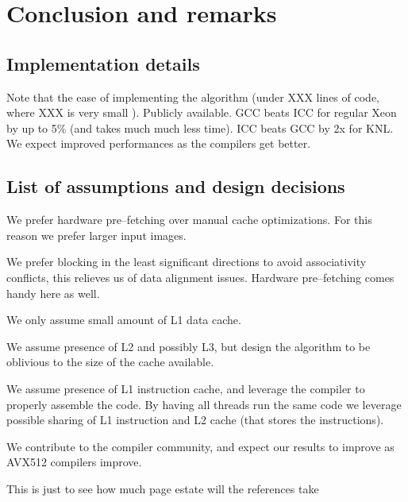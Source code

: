 \section{Conclusion and remarks}


\subsection{Implementation details}

  Note that the ease of implementing the algorithm (under XXX lines of
  code, where XXX is very small ).
  Publicly available.  GCC beats ICC for regular Xeon by up to 5\%
  (and takes much much less time).  ICC beats GCC by 2x for KNL.  We
  expect improved performances as the compilers get better.



\subsection{List of assumptions and design decisions}

  We prefer hardware pre--fetching over manual cache optimizations.
  For this reason we prefer larger input images.

  We prefer blocking in the least significant directions to avoid
  associativity conflicts, this relieves us of data alignment issues.
  Hardware pre--fetching comes handy here as well.

  We only assume small amount of L1 data cache.

  We assume presence of L2 and possibly L3, but design the algorithm
  to be oblivious to the size of the cache available.

  We assume presence of L1 instruction cache, and leverage the
  compiler to properly assemble the code.  By having all threads run
  the same code we leverage possible sharing of L1 instruction and L2
  cache (that stores the instructions).

  We contribute to the compiler community, and expect our results to
  improve as AVX512 compilers improve.

  This is just to see how much page estate will the references
  take~\cite{zlateski2016znn, zlateski2016znni, cpu-myth, idlf,
    mkl-dnn, neonnervana, hadjis2015shallow, chetlur2014cudnn,
    szegedy2015going, jeffers2016knl, ronneberger2015u,
    jeffers2015high, simonyan2014very, krizhevsky2012imagenet,
    sermanet2013overfeat, lee2015recursive, jain2007supervised,
    jia2014caffe, reinders2007intel, viebke2015potential}
